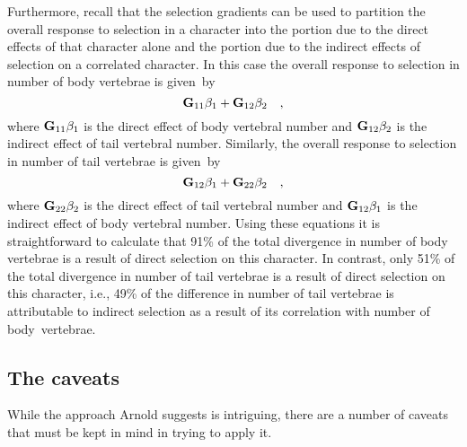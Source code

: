 \documentclass[12pt]{article}
\begin{document}
Furthermore, recall that the selection gradients can be used to
partition the overall response to selection in a character into the
portion due to the direct effects of that character alone and the
portion due to the indirect effects of selection on a correlated
character. In this case the overall response to selection in number of
body vertebrae is given~by
\[
{\bf G}_{11}\beta_1 + {\bf G}_{12}\beta_2 \quad ,
\]
where ${\bf G}_{11}\beta_1$ is the direct effect of body vertebral
number and ${\bf G}_{12}\beta_2$ is the indirect effect of tail
vertebral number. Similarly, the overall response to selection in
number of tail vertebrae is given~by
\[
{\bf G}_{12}\beta_1 + {\bf G}_{22}\beta_2 \quad ,
\]
where ${\bf G}_{22}\beta_2$ is the direct effect of tail vertebral
number and ${\bf G}_{12}\beta_1$ is the indirect effect of body
vertebral number. Using these equations it is straightforward to
calculate that 91\% of the total divergence in number of body
vertebrae is a result of direct selection on this character. In
contrast, only 51\% of the total divergence in number of tail
vertebrae is a result of direct selection on this character, i.e.,
49\% of the difference in number of tail vertebrae is attributable to
indirect selection as a result of its correlation with number of
body~vertebrae.

\subsection*{The caveats}

While the approach Arnold suggests is intriguing, there are a number
of caveats that must be kept in mind in trying to apply it.
\end{document}
